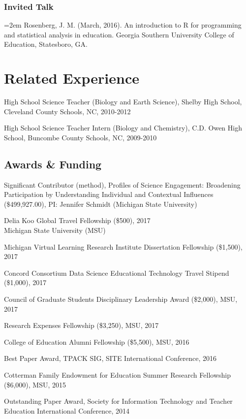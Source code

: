 \documentclass[]{article}
\begin{document}
\subsubsection{Invited Talk}\label{invited-talk}

\hangindent=2em Rosenberg, J. M. (March, 2016). An introduction to R for
programming and statistical analysis in education. Georgia Southern
University College of Education, Statesboro, GA.

\section{Related Experience}\label{related-experience}

High School Science Teacher (Biology and Earth Science), Shelby High
School, Cleveland County Schools, NC, 2010-2012

High School Science Teacher Intern (Biology and Chemistry), C.D. Owen
High School, Buncombe County Schools, NC, 2009-2010

\subsection{Awards \& Funding}\label{awards-funding}

Significant Contributor (method), Profiles of Science Engagement:
Broadening Participation by Understanding Individual and Contextual
Influences (\$499,927.00), PI: Jennifer Schmidt (Michigan State
University)

Delia Koo Global Travel Fellowship (\$500), 2017\\
Michigan State University (MSU)

Michigan Virtual Learning Research Institute Dissertation Fellowship
(\$1,500), 2017

Concord Consortium Data Science Educational Technology Travel Stipend
(\$1,000), 2017

Council of Graduate Students Disciplinary Leadership Award (\$2,000),
MSU, 2017

Research Expenses Fellowship (\$3,250), MSU, 2017

College of Education Alumni Fellowship (\$5,500), MSU, 2016

Best Paper Award, TPACK SIG, SITE International Conference, 2016

Cotterman Family Endowment for Education Summer Research Fellowship
(\$6,000), MSU, 2015

Outstanding Paper Award, Society for Information Technology and Teacher
Education International Conference, 2014
\end{document}
